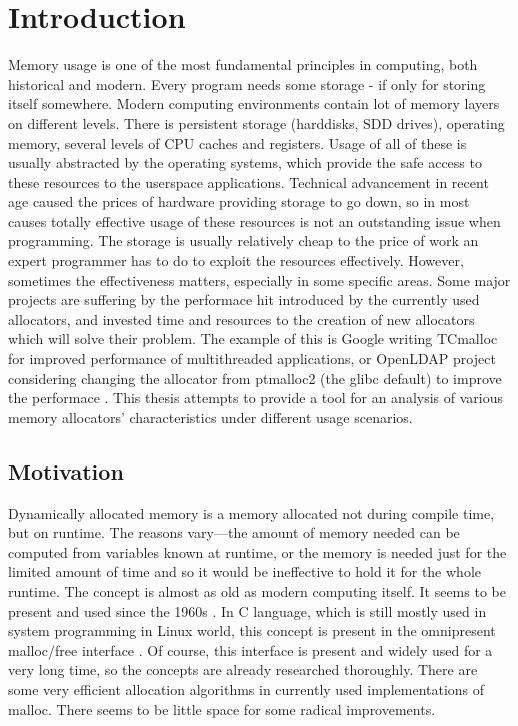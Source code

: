
\chapter{Introduction}

Memory usage is one of the most fundamental principles in computing, both
historical and modern. Every program needs some storage - if only for storing
itself somewhere. Modern computing environments contain lot of memory layers on
different levels. There is persistent storage (harddisks, SDD drives), operating
memory, several levels of CPU caches and registers. Usage of all of these is
usually abstracted by the operating systems, which provide the safe access to
these resources to the userspace applications. Technical advancement in recent
age caused the prices of hardware providing storage to go down, so in most causes
totally effective usage of these resources is not an outstanding issue when
programming. The storage is usually relatively cheap to the price of work an
expert programmer has to do to exploit the resources effectively. However,
sometimes the effectiveness matters, especially in some specific areas. Some
major projects are suffering by the performace hit introduced by the currently
used allocators, and invested time and resources to the creation of new
allocators which will solve their problem. The example of this is Google writing
TCmalloc for improved performance of multithreaded applications, or OpenLDAP
project considering changing the allocator from ptmalloc2 (the glibc default) to
improve the performace \cite{openldap-pres}. This thesis attempts to provide a
tool for an analysis of various memory allocators' characteristics under
different usage scenarios.

\section{Motivation}

Dynamically allocated memory is a memory allocated not during compile time, but
on runtime. The reasons vary---the amount of memory needed can be computed from
variables known at runtime, or the memory is needed just for the limited amount
of time and so it would be ineffective to hold it for the whole runtime. The
concept is almost as old as modern computing itself. It seems to be present and
used since the 1960s \cite{DSAsurvey}. In C language, which is still mostly used
in system programming in Linux world, this concept is present in the omnipresent
malloc/free interface \cite{glibc-man-malloc}. Of course, this interface is
present and widely used for a very long time, so the concepts are already
researched thoroughly. There are some very efficient allocation algorithms in
currently used implementations of malloc. There seems to be little space for some
radical improvements.

